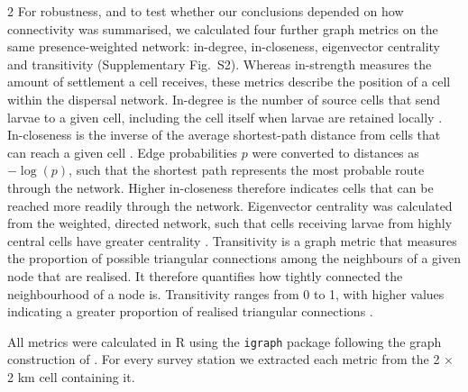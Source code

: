 \begin{spacing}{2}
For robustness, and to test whether our conclusions depended on how connectivity was summarised, we calculated four further graph metrics on the same presence-weighted network: in-degree, in-closeness, eigenvector centrality and transitivity (Supplementary Fig.~S2). Whereas in-strength measures the amount of settlement a cell receives, these metrics describe the position of a cell within the dispersal network. In-degree is the number of source cells that send larvae to a given cell, including the cell itself when larvae are retained locally \citep{freemanCentralitySocialNetworks1978}. In-closeness is the inverse of the average shortest-path distance from cells that can reach a given cell \citep{estradaUSINGNETWORKCENTRALITY2008}. Edge probabilities $p$ were converted to distances as $-\log(p)$, such that the shortest path represents the most probable route through the network. Higher in-closeness therefore indicates cells that can be reached more readily through the network. Eigenvector centrality was calculated from the weighted, directed network, such that cells receiving larvae from highly central cells have greater centrality \citep{bonacichPowerCentralityFamily1987}. Transitivity is a graph metric that measures the proportion of possible triangular connections among the neighbours of a given node that are realised. It therefore quantifies how tightly connected the neighbourhood of a node is. Transitivity ranges from 0 to 1, with higher values indicating a greater proportion of realised triangular connections \citep{hansenAssessingDemographicConnectivity2024}.

All metrics were calculated in R using the \texttt{igraph} package \citep{csardi2006} following the graph construction of \citet{hansenAssessingDemographicConnectivity2024}. For every survey station we extracted each metric from the 2 × 2 km cell containing it.




\end{spacing}
